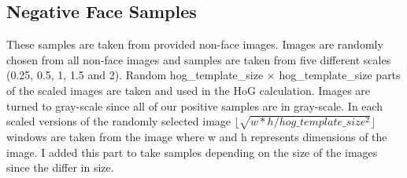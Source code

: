 \documentclass{article}
\begin{document}
\subsection{Negative Face Samples}
These samples are taken from provided non-face images. Images are randomly chosen from all non-face images and samples are taken from five different scales (0.25, 0.5, 1, 1.5 and 2). Random hog\_template\_size $\times$ hog\_template\_size parts of the scaled images are taken and used in the HoG calculation. Images are turned to gray-scale since all of our positive samples are in gray-scale. In each scaled versions of the randomly selected image $\lfloor \sqrt{w * h / hog\_template\_size^2}\rfloor$ windows are taken from the image where w and h represents dimensions of the image. I added this part to take samples depending on the size of the images since the differ in size.
\end{document}
